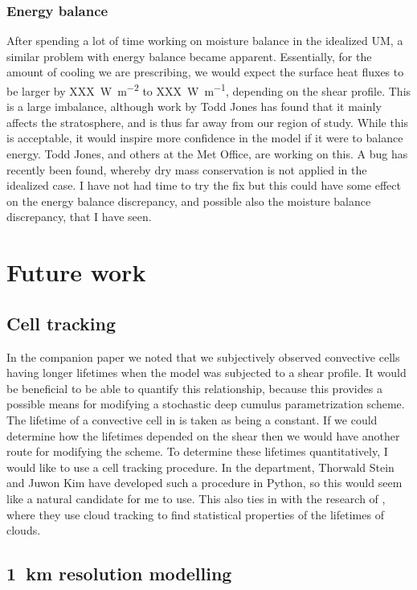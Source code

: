 \documentclass[11pt,a4paper]{article}
\begin{document}
\subsubsection{Energy balance}
After spending a lot of time working on moisture balance in the idealized UM, a similar problem with energy balance became apparent. Essentially, for the amount of cooling we are prescribing, we would expect the surface heat fluxes to be larger by \SI{XXX}{W.m^{-2}} to \SI{XXX}{W.m^{-1}}, depending on the shear profile. This is a large imbalance, although work by Todd Jones has found that it mainly affects the stratosphere, and is thus far away from our region of study. While this is acceptable, it would inspire more confidence in the model if it were to balance energy. Todd Jones, and others at the Met Office, are working on this. A bug has recently been found, whereby dry mass conservation is not applied in the idealized case. I have not had time to try the fix but this could have some effect on the energy balance discrepancy, and possible also the moisture balance discrepancy, that I have seen.

\section{Future work}

\subsection{Cell tracking}
\label{sec:cell_tracking}

In the companion paper we noted that we subjectively observed convective cells having longer lifetimes when the model was subjected to a shear profile. It would be beneficial to be able to quantify this relationship, because this provides a possible means for modifying a stochastic deep cumulus parametrization scheme. The lifetime of a convective cell in \cite{plant2008stochastic} is taken as being a constant. If we could determine how the lifetimes depended on the shear then we would have another route for modifying the scheme. To determine these lifetimes quantitatively, I would like to use a cell tracking procedure. In the department, Thorwald Stein and Juwon Kim have developed such a procedure in Python, so this would seem like a natural candidate for me to use. This also ties in with the research of \cite{plant2009statistical}, where they use cloud tracking to find statistical properties of the lifetimes of clouds. 

\subsection{\SI{1}{km} resolution modelling}
\label{sec:1km_res}
\end{document}
